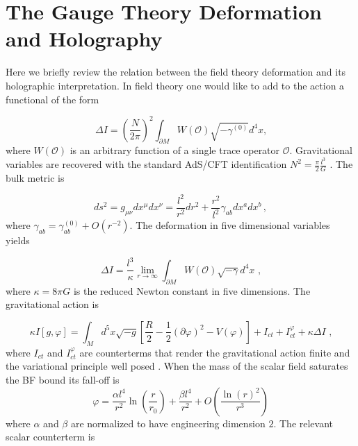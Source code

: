 \documentclass[11pt,epsf,letterpaper]{article}%
\begin{document}
\section{The Gauge Theory Deformation and Holography}

Here we briefly review the relation between the field theory deformation and
its holographic interpretation. In field theory one would like to add to the
action a functional of the form \cite{Witten:2001ua}%

\begin{equation}
\Delta I=\left(  \frac{N}{2\pi}\right)  ^{2}\int_{\partial M}W(\mathcal{O}%
)\sqrt{-\gamma^{\left(  0\right)  }}d^{4}x\text{,}%
\end{equation}
where $W(\mathcal{O})$ is an arbitrary function of a single trace operator
$\mathcal{O}$. Gravitational variables are recovered with the standard AdS/CFT
identification $N^{2}=\frac{\pi}{2}\frac{l^{3}}{G}$ \cite{Maldacena:1997re}.
The bulk metric is%

\begin{equation}
ds^{2}=g_{\mu\nu}dx^{\mu}dx^{\nu}=\frac{l^{2}}{r^{2}}dr^{2}+\frac{r^{2}}%
{l^{2}}\gamma_{ab}dx^{a}dx^{b}\,,
\end{equation}
where $\gamma_{ab}=\gamma_{ab}^{\left(  0\right)  }+O(r^{-2})$. The
deformation in five dimensional variables yields%

\begin{equation}
\Delta I=\frac{l^{3}}{\kappa}\lim_{r\rightarrow\infty}\int_{\partial
M}W(\mathcal{O})\sqrt{-\gamma}d^{4}x\text{ ,}%
\end{equation}
where $\kappa=8\pi G$ is the reduced Newton constant in five dimensions. The
gravitational action is%

\begin{equation}
\kappa I\left[  g,\varphi\right]  =\int_{M}d^{5}x\sqrt{-g}\left[  \frac{R}%
{2}-\frac{1}{2}\left(  \partial\varphi\right)  ^{2}-V(\varphi)\right]
+I_{ct}+I_{ct}^{\varphi}+\kappa\Delta I\text{ ,}%
\end{equation}
where $I_{ct}$ and $I_{ct}^{\varphi}$ are counterterms that render the
gravitational action finite and the variational principle well posed
\cite{Anabalon:2016yfg, Henningson:1998gx, Balasubramanian:1999re,
Mann:1999pc, Bianchi:2001de, Bianchi:2001kw, Marolf:2006nd,
Papadimitriou:2007sj, Anabalon:2015xvl}. When the mass of the scalar field
saturates the BF bound its fall-off is
\begin{equation}
\varphi=\frac{\alpha l^{4}}{r^{2}}\ln\left(  \frac{r}{r_{0}}\right)
+\frac{\beta l^{4}}{r^{2}}+O\left(  \frac{\ln\left(  r\right)  ^{2}}{r^{3}%
}\right)  \label{phi1}%
\end{equation}
where $\alpha$ and $\beta$ are normalized to have engineering dimension $2$.
The relevant scalar counterterm is \cite{Anabalon:2016yfg, Marolf:2006nd}%
\end{document}
